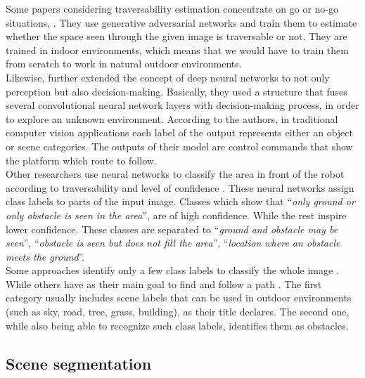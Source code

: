 \documentclass[12pt,a4paper,table,dvipsnames,tikz]{report}
\newcommand{\defn}[1]{\enquote{\textit{#1}}}
\begin{document}
	Some papers considering traversability estimation concentrate on go or no-go situations, 
	\citep{HiroseGonet, HiroseVunet}. They use generative adversarial networks and train 
	them to estimate whether the space seen through the given image is traversable or not. 
	They are trained in indoor environments, which means that we would have to train them 
	from scratch to work in natural outdoor environments.
	\\
	
	Likewise, \citet{Tai} further extended the concept of deep neural networks to not only 
	perception but also decision-making. Basically, they used a structure that fuses several 
	convolutional neural network layers with decision-making process, in order to explore 
	an unknown environment. According to the authors, in traditional computer vision 
	applications each label of the output represents either an object or scene categories. 
	The outputs of their model are control commands that show the platform which route to 
	follow.
	\\
	
	Other researchers use neural networks to classify the area in front of the robot 
	according to traversability and level of confidence \citep{Sermanet, Hadsell}. These 
	neural networks assign class labels to parts of the input image. Classes which show 
	that \defn{only ground or only obstacle is seen in the area}, are of high confidence. 
	While the rest inspire lower confidence. These classes are separated to 
	\defn{ground and obstacle may be seen}, \defn{obstacle is seen but does not fill the area}, 
	\defn{location where an obstacle meets the ground}.
	\\
	
	Some approaches identify only a few class labels to classify the whole image 
	\citep{Holder, Bosch, Farabet}. While others have as their main goal to find and follow 
	a path \citep{Yang, Orsic}. The first category usually includes scene labels that can 
	be used in outdoor environments (such as sky, road, tree, grass, building), as their 
	title declares. The second one, while also being able to recognize such class labels, 
	identifies them as obstacles.
	\\
	
	
	\subsection{Scene segmentation}
	\label{sec:fg:nn:segm}
	
\end{document}
